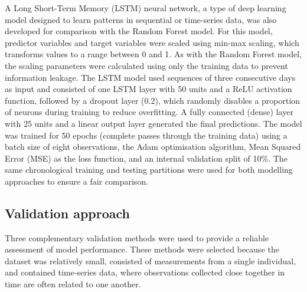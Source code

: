 \documentclass[fleqn,10pt]{wlscirep}
\begin{document}
A Long Short-Term Memory (LSTM) neural network, a type of deep learning model designed to learn patterns in sequential or time-series data, was also developed for comparison with the Random Forest model. For this model, predictor variables and target variables were scaled using min-max scaling, which transforms values to a range between 0 and 1. As with the Random Forest model, the scaling parameters were calculated using only the training data to prevent information leakage. The LSTM model used sequences of three consecutive days as input and consisted of one LSTM layer with 50 units and a ReLU activation function, followed by a dropout layer (0.2), which randomly disables a proportion of neurons during training to reduce overfitting. A fully connected (dense) layer with 25 units and a linear output layer generated the final predictions. The model was trained for 50 epochs (complete passes through the training data) using a batch size of eight observations, the Adam optimisation algorithm, Mean Squared Error (MSE) as the loss function, and an internal validation split of 10\%. The same chronological training and testing partitions were used for both modelling approaches to ensure a fair comparison.

\subsection*{Validation approach}

Three complementary validation methods were used to provide a reliable assessment of model performance. These methods were selected because the dataset was relatively small, consisted of measurements from a single individual, and contained time-series data, where observations collected close together in time are often related to one another.
\end{document}
